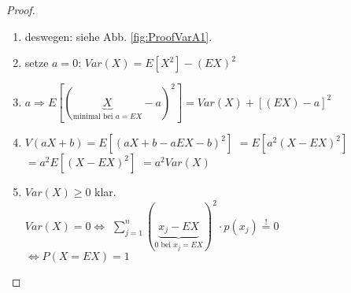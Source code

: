 \begin{proof}
\begin{enumerate}
\item {} deswegen: siehe Abb. \ref{fig:ProofVarA1}. 
\item setze $a=0$: $Var(X)=E[X^2]-(EX)^2$
\item $a \Rightarrow E[(\underbrace{X}_{\textrm{minimal bei } a=EX}-a)^2] = Var(X) + [(EX)-a]^2$
\item $V(aX+b) = E[(aX+b - aEX-b)^2]$
$=E[a^2 (X-EX)^2]$
$=a^2 E[(X-EX)^2]$
$=a^2 Var(X)$
\item $Var(X) \geq 0 $ klar.\\
$Var(X) = 0 \Leftrightarrow $
$\sum_{j=1}^{n} (\underbrace{x_j - EX}_{\textrm{0 bei }x_j = EX})^2 \cdot p(x_j) \overset{!}{=} 0$\\
$\Leftrightarrow P(X=EX)=1$
\end{enumerate}
\end{proof}